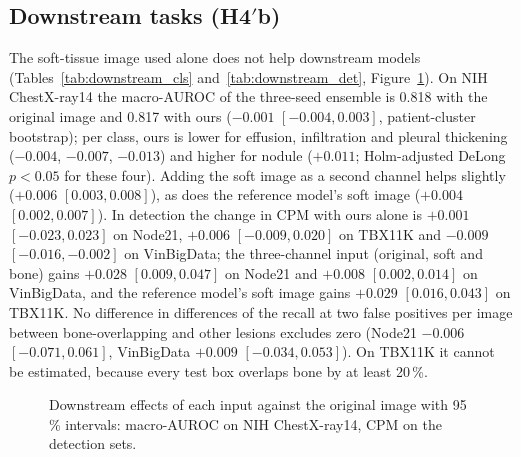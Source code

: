 \subsection{Downstream tasks (\texorpdfstring{H4$'$b}{H4'b})}
The soft-tissue image used alone does not help downstream models (Tables~\ref{tab:downstream_cls} and~\ref{tab:downstream_det},
Figure~\ref{fig:downstream_forest}). On NIH ChestX-ray14 the macro-AUROC of the three-seed ensemble is 0.818 with the original image and
0.817 with ours ($-0.001$ $[-0.004,0.003]$, patient-cluster bootstrap); per class, ours is lower for effusion, infiltration and pleural
thickening ($-0.004$, $-0.007$, $-0.013$) and higher for nodule ($+0.011$; Holm-adjusted DeLong $p<0.05$ for these four). Adding the soft image
as a second channel helps slightly ($+0.006$ $[0.003,0.008]$), as does the reference model's soft image ($+0.004$ $[0.002,0.007]$). In
detection the change in CPM with ours alone is $+0.001$ $[-0.023,0.023]$ on Node21, $+0.006$ $[-0.009,0.020]$ on TBX11K and $-0.009$
$[-0.016,-0.002]$ on VinBigData; the three-channel input (original, soft and bone) gains $+0.028$ $[0.009,0.047]$ on Node21 and $+0.008$
$[0.002,0.014]$ on VinBigData, and the reference model's soft image gains $+0.029$ $[0.016,0.043]$ on TBX11K. No difference in differences of
the recall at two false positives per image between bone-overlapping and other lesions excludes zero (Node21 $-0.006$ $[-0.071,0.061]$,
VinBigData $+0.009$ $[-0.034,0.053]$). On TBX11K it cannot be estimated, because every test box overlaps bone by at least 20\,\%.
\begin{table}[htbp]
\centering\small
\caption{Downstream classification on NIH ChestX-ray14: macro-AUROC of the three-seed ensemble, per-seed mean $\pm$ SD and the difference to
the original image (patient-cluster bootstrap).}
\label{tab:downstream_cls}
\end{table}
\begin{table}[htbp]
\centering\small
\caption{Downstream detection on Node21, TBX11K and VinBigData: CPM and mAP@50 (mean $\pm$ SD over three seeds), differences to the original
image and the difference in differences (DiD) of recall at two false positives per image (image bootstrap).}
\label{tab:downstream_det}
\end{table}
\begin{figure}[htbp]
\centering
{}
\caption{Downstream effects of each input against the original image with 95\,\% intervals: macro-AUROC on NIH ChestX-ray14, CPM on the
detection sets.}
\label{fig:downstream_forest}
\end{figure}

